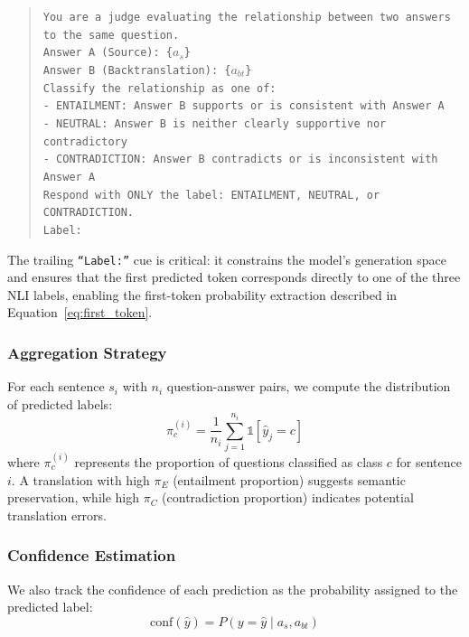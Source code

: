     \begin{quote}
    \small
    \texttt{You are a judge evaluating the relationship between two answers to the same question.}\\[3pt]
    \texttt{Answer A (Source): \{$a_s$\}}\\
    \texttt{Answer B (Backtranslation): \{$a_{bt}$\}}\\[3pt]
    \texttt{Classify the relationship as one of:}\\
    \texttt{- ENTAILMENT: Answer B supports or is consistent with Answer A}\\
    \texttt{- NEUTRAL: Answer B is neither clearly supportive nor contradictory}\\
    \texttt{- CONTRADICTION: Answer B contradicts or is inconsistent with Answer A}\\[3pt]
    \texttt{Respond with ONLY the label: ENTAILMENT, NEUTRAL, or CONTRADICTION.}\\
    \texttt{Label:}
    \end{quote}

    The trailing \texttt{``Label:''} cue is critical: it constrains the model's generation space and ensures that the first predicted token corresponds directly to one of the three NLI labels, enabling the first-token probability extraction described in Equation~\ref{eq:first_token}.

    \subsubsection{Aggregation Strategy}

    For each sentence $s_i$ with $n_i$ question-answer pairs, we compute the distribution of predicted labels:
    \begin{equation}
        \pi_c^{(i)} = \frac{1}{n_i} \sum_{j=1}^{n_i} \mathbb{1}[\hat{y}_j = c]
    \end{equation}
    where $\pi_c^{(i)}$ represents the proportion of questions classified as class $c$ for sentence $i$. A translation with high $\pi_E$ (entailment proportion) suggests semantic preservation, while high $\pi_C$ (contradiction proportion) indicates potential translation errors.

    \subsubsection{Confidence Estimation}

    We also track the confidence of each prediction as the probability assigned to the predicted label:
    \begin{equation}
        \text{conf}(\hat{y}) = P(y = \hat{y} \mid a_s, a_{bt})
    \end{equation}


